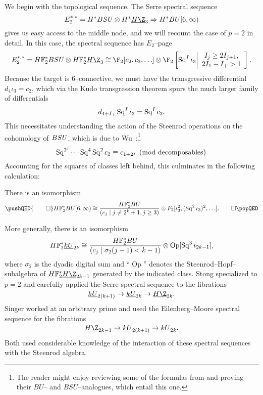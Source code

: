 We begin with the topological sequence.  The Serre spectral sequence \[E_2^{*, *} = H^* B\SU \otimes H^* \OS{H\Z}{3} \Rightarrow H^* BU[6, \infty)\] gives us easy access to the middle node, and we will recount the case of $p = 2$ in detail.  In this case, the spectral sequence has $E_2$--page \[E_2^{*, *} = \HFtwo^* B\SU \otimes \HFtwo^* \OS{H\Z}{3} \cong \F_2[c_2, c_3, \ldots] \otimes \F_2\left[\Sq^I \iota_3 \middle| \begin{array}{c} I_j \ge 2I_{j+1}, \\ 2 I_1 - I_+ > 1 \end{array}\right].\]  Because the target is $6$--connective, we must have the transgressive differential $d_4 \iota_3 = c_2$, which via the Kudo transgression theorem spurs the much larger family of differentials \[d_{4+I_+} \operatorname{Sq}^I \iota_3 = \operatorname{Sq}^I c_2.\]  This necessitates understanding the action of the Steenrod operations on the cohomology of $B\mathit{SU}$, which is due to Wu~\cite[Section 23.6]{MayConciseCourse}:\footnote{The reader might enjoy reviewing some of the formulas from  and proving their $BU$-- and $BSU$--analogues, which entail this one.} \[\operatorname{Sq}^{2^j} \cdots \operatorname{Sq}^4 \operatorname{Sq}^2 c_2 \equiv c_{1 + 2^j} \pmod{\text{decomposables}}.\]  Accounting for the squares of classes left behind, this culminates in the following calculation:

\begin{theorem}\label{HF2BU6Calculation}
There is an isomorphism
\[\pushQED{\qed}
\HFtwo^* BU[6, \infty) \cong \frac{\HFtwo^* BU}{(c_j \mid j \ne 2^k + 1, j \ge 3)} \otimes F_2[\iota_3^2, (\Sq^2 \iota_3)^2, \ldots]. \qedhere
\popQED\]
\end{theorem}

\begin{remark}
More generally, there is an isomorphism \[\HFtwo^* \OS{kU}{2k} \cong \frac{\HFtwo^* BU}{(c_j \mid \sigma_2(j - 1) < k - 1)} \otimes \operatorname{Op}[\Sq^3 \iota_{2k-1}],\] where $\sigma_2$ is the dyadic digital sum and ``$\operatorname{Op}$'' denotes the Steenrod--Hopf--subalgebra of $\HFtwo^* \OS{H\Z}{2k-1}$ generated by the indicated class.  Stong specialized to $p = 2$ and carefully applied the Serre spectral sequence to the fibrations \[\OS{kU}{2(k+1)} \to \OS{kU}{2k} \to \OS{H\Z}{2k}.\]  Singer worked at an arbitrary prime and used the Eilenberg--Moore spectral sequence for the fibrations \[\OS{H\Z}{2k-1} \to \OS{kU}{2(k+1)} \to \OS{kU}{2k}.\]  Both used considerable knowledge of the interaction of these spectral sequences with the Steenrod algebra.
\end{remark}

